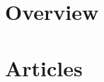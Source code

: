 \documentclass[12pt]{book} %
\begin{document}
\cleardoublepage
\tableofcontents
\thispagestyle{empty}
\cleardoublepage
\mainmatter
%
%
\part{Overview}
\label{part:1}



%
%
\cleardoublepage


\cleardoublepage

\part{Articles}
\label{part:2}

\cleardoublepage
\begin{appendices}
    
\end{appendices}

\backmatter


\end{document}
